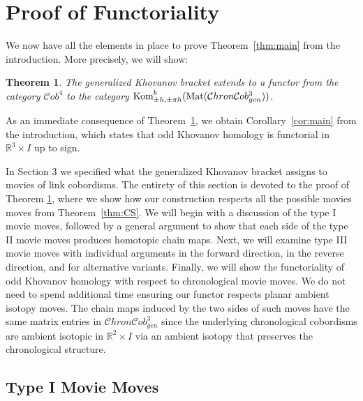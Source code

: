 \documentclass[12pt]{amsart}
\theoremstyle{definition}
\theoremstyle{plain}
\newtheorem{theorem}{Theorem}
\newcommand{\cobIV}{\mathcal{C}ob^4}
\newcommand{\cobIIIgen}{\mathcal{C}hron\mathcal{C}ob^3_{gen}}
\newcommand{\mat}[1]{\textnormal{Mat}(#1)}
\begin{document}
\section{Proof of Functoriality}\label{s:functoriality}

We now have all the elements in place to prove Theorem~\ref{thm:main} from the introduction.
More precisely, we will show:

\begin{theorem}\label{thr:GKHfunctor}
    The generalized Khovanov bracket extends to a functor from the category $\cobIV$ to the category
    $\textnormal{Kom}^b_{\pm h,\pm\pi h}(\mat{\cobIIIgen})$.
\end{theorem}

As an immediate consequence of Theorem~\ref{thr:GKHfunctor}, we obtain
Corollary~\ref{cor:main}
from the introduction, which states that odd Khovanov homology is functorial in $\mathbb{R}^3\times I$ up to sign.

In Section 3 we specified what the generalized Khovanov bracket assigns to movies of link cobordisms.  The entirety of this section is devoted to the proof of Theorem \ref{thr:GKHfunctor}, where we show how our construction respects all the possible 
movies moves from Theorem~\ref{thm:CS}.
We will begin with a discussion of the type I movie moves, followed by a general argument to show that each side of the type II movie moves produces homotopic chain maps.  Next, we will examine type III movie moves with individual arguments in the forward direction, in the reverse direction, and for alternative variants.  Finally, we will show the functoriality of odd Khovanov homology with respect to chronological movie moves. We do not need to spend additional time ensuring our functor respects
planar ambient isotopy moves.
The chain maps induced by the two sides of such moves have the same matrix entries in $\cobIIIgen$
since the underlying chronological cobordisms are ambient isotopic in $\mathbb{R}^2\times I$ via
an ambient isotopy that preserves the chronological structure.

\subsection{Type I Movie Moves}
\end{document}
